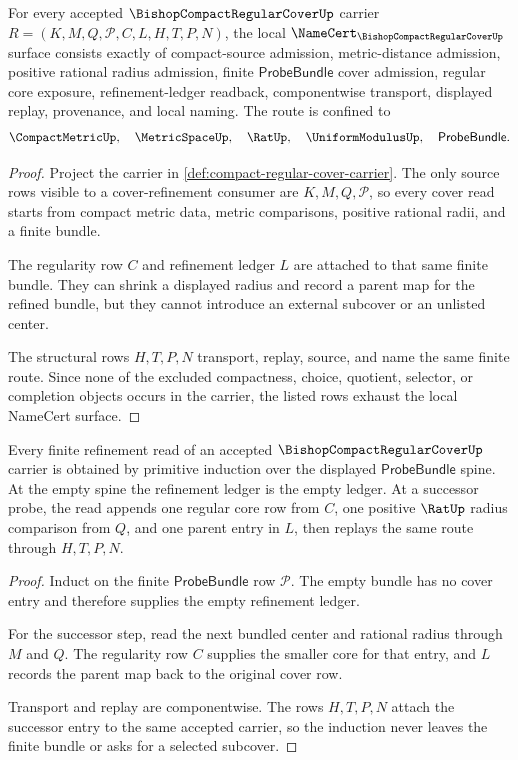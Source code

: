 \begin{theorem}
\label{thm:compact-regular-cover-namecert-obligations}
For every accepted $\BishopCompactRegularCoverUp$ carrier $R=(K,M,Q,\mathcal{P},C,L,H,T,P,N)$, the local $\NameCert_{\BishopCompactRegularCoverUp}$ surface consists exactly of compact-source admission, metric-distance admission, positive rational radius admission, finite $\mathsf{ProbeBundle}$ cover admission, regular core exposure, refinement-ledger readback, componentwise transport, displayed replay, provenance, and local naming. The route is confined to
$$
\CompactMetricUp,\quad \MetricSpaceUp,\quad \RatUp,\quad \UniformModulusUp,\quad \mathsf{ProbeBundle}.
$$
\end{theorem}
\begin{proof}
Project the carrier in \autoref{def:compact-regular-cover-carrier}. The only source rows visible to a cover-refinement consumer are $K,M,Q,\mathcal{P}$, so every cover read starts from compact metric data, metric comparisons, positive rational radii, and a finite bundle.

The regularity row $C$ and refinement ledger $L$ are attached to that same finite bundle. They can shrink a displayed radius and record a parent map for the refined bundle, but they cannot introduce an external subcover or an unlisted center.

The structural rows $H,T,P,N$ transport, replay, source, and name the same finite route. Since none of the excluded compactness, choice, quotient, selector, or completion objects occurs in the carrier, the listed rows exhaust the local NameCert surface.
\end{proof}

\begin{theorem}
\label{thm:compact-regular-cover-refinement-induction}
Every finite refinement read of an accepted $\BishopCompactRegularCoverUp$ carrier is obtained by primitive induction over the displayed $\mathsf{ProbeBundle}$ spine. At the empty spine the refinement ledger is the empty ledger. At a successor probe, the read appends one regular core row from $C$, one positive $\RatUp$ radius comparison from $Q$, and one parent entry in $L$, then replays the same route through $H,T,P,N$.
\end{theorem}
\begin{proof}
Induct on the finite $\mathsf{ProbeBundle}$ row $\mathcal{P}$. The empty bundle has no cover entry and therefore supplies the empty refinement ledger.

For the successor step, read the next bundled center and rational radius through $M$ and $Q$. The regularity row $C$ supplies the smaller core for that entry, and $L$ records the parent map back to the original cover row.

Transport and replay are componentwise. The rows $H,T,P,N$ attach the successor entry to the same accepted carrier, so the induction never leaves the finite bundle or asks for a selected subcover.
\end{proof}

